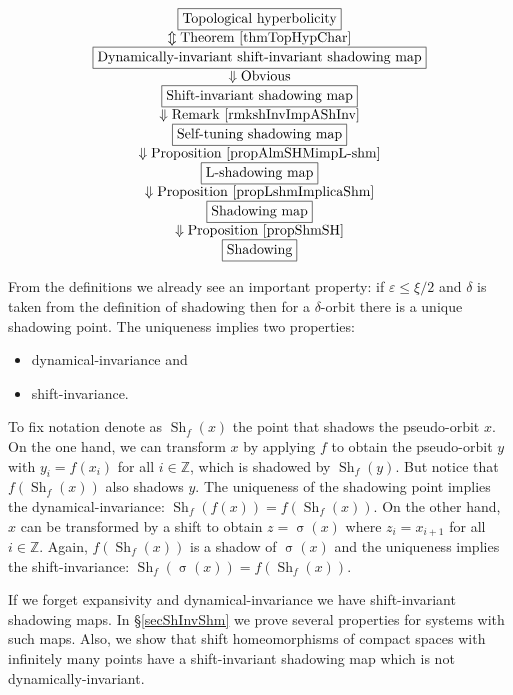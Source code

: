 \documentclass[12pt]{amsart}
\DeclareMathOperator{\shift}{\sigma}
\theoremstyle{plain}
\theoremstyle{definition}
\theoremstyle{remark}
\DeclareMathOperator{\shm}{Sh}
\newcommand{\Z}{\mathbb Z}
\renewcommand{\epsilon}{\varepsilon}
\newcommand{\expc}{\xi}
\begin{document}
\begin{table}[ht]
	\[
	\begin{array}{c}
		\hbox{\fbox{Topological hyperbolicity}}
		\\
		\Updownarrow \text{Theorem \ref{thmTopHypChar}}
		\\
		\hbox{\fbox{Dynamically-invariant shift-invariant shadowing map}}
		\\
		\Downarrow \text{Obvious}
		\\
		\hbox{\fbox{Shift-invariant shadowing map}}
		\\
		\Downarrow \text{Remark \ref{rmkshInvImpAShInv}}
		\\
		\hbox{\fbox{Self-tuning shadowing map}}
		\\
		\Downarrow \text{Proposition \ref{propAlmSHMimpL-shm}}
		\\
		\hbox{\fbox{L-shadowing map}}
		\\
		\Downarrow\text{Proposition \ref{propLshmImplicaShm}}
		\\
		\hbox{\fbox{Shadowing map}}
		\\
		\Downarrow \text{Proposition \ref{propShmSH}}
		\\
		\hbox{\fbox{Shadowing}}
	\end{array}
	\]
	\caption{Hierarchy of shadowing maps.}
	\label{tablaShm}
\end{table}
From the definitions we already see an important property: if $\epsilon\leq\expc/2$ and $\delta$ is taken from the definition of shadowing then for a $\delta$-orbit there is a unique shadowing point.
The uniqueness implies two properties:
\begin{itemize}
	\item dynamical-invariance and
	\item shift-invariance.
\end{itemize}
To fix notation denote as $\shm_f(x)$ the point that shadows the pseudo-orbit $x$.
On the one hand, we can transform $x$ by applying $f$ to obtain the pseudo-orbit $y$ with $y_i=f(x_i)$ for all $i\in\Z$, which is shadowed by $\shm_f(y)$. But notice that $f(\shm_f(x))$ also shadows $y$. The uniqueness of the shadowing point implies the dynamical-invariance: $\shm_f(f(x))=f(\shm_f(x))$.
On the other hand, $x$ can be transformed by a shift to obtain $z=\shift(x)$ where $z_i=x_{i+1}$ for all $i\in\Z$.
Again, $f(\shm_f(x))$ is a shadow of $\shift(x)$ and the uniqueness implies the shift-invariance:
$\shm_f(\shift(x))=f(\shm_f(x))$.

If we forget expansivity and dynamical-invariance we have shift-invariant shadowing maps. In \S\ref{secShInvShm} we prove several properties for systems with such maps. Also, we show that shift homeomorphisms of compact spaces with infinitely many points have a shift-invariant shadowing map which is not dynamically-invariant.
\end{document}
